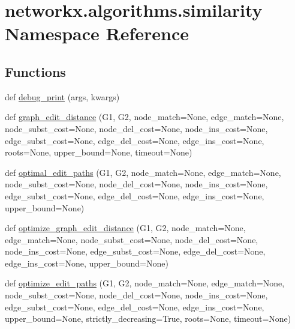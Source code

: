 \hypertarget{namespacenetworkx_1_1algorithms_1_1similarity}{}\section{networkx.\+algorithms.\+similarity Namespace Reference}
\label{namespacenetworkx_1_1algorithms_1_1similarity}
\subsection*{Functions}
\begin{DoxyCompactItemize}
\item 
def \hyperlink{namespacenetworkx_1_1algorithms_1_1similarity_a5d674d26dfed10d077b2bcba5902a5f8}{debug\+\_\+print} (args, kwargs)
\item 
def \hyperlink{namespacenetworkx_1_1algorithms_1_1similarity_a884d76faa68663c18288eb5f32eaea7b}{graph\+\_\+edit\+\_\+distance} (G1, G2, node\+\_\+match=None, edge\+\_\+match=None, node\+\_\+subst\+\_\+cost=None, node\+\_\+del\+\_\+cost=None, node\+\_\+ins\+\_\+cost=None, edge\+\_\+subst\+\_\+cost=None, edge\+\_\+del\+\_\+cost=None, edge\+\_\+ins\+\_\+cost=None, roots=None, upper\+\_\+bound=None, timeout=None)
\item 
def \hyperlink{namespacenetworkx_1_1algorithms_1_1similarity_a29f7692d60e03483f0160961805dc9fb}{optimal\+\_\+edit\+\_\+paths} (G1, G2, node\+\_\+match=None, edge\+\_\+match=None, node\+\_\+subst\+\_\+cost=None, node\+\_\+del\+\_\+cost=None, node\+\_\+ins\+\_\+cost=None, edge\+\_\+subst\+\_\+cost=None, edge\+\_\+del\+\_\+cost=None, edge\+\_\+ins\+\_\+cost=None, upper\+\_\+bound=None)
\item 
def \hyperlink{namespacenetworkx_1_1algorithms_1_1similarity_a094b2ec3e7fd9c7e6b285ff592c1384c}{optimize\+\_\+graph\+\_\+edit\+\_\+distance} (G1, G2, node\+\_\+match=None, edge\+\_\+match=None, node\+\_\+subst\+\_\+cost=None, node\+\_\+del\+\_\+cost=None, node\+\_\+ins\+\_\+cost=None, edge\+\_\+subst\+\_\+cost=None, edge\+\_\+del\+\_\+cost=None, edge\+\_\+ins\+\_\+cost=None, upper\+\_\+bound=None)
\item 
def \hyperlink{namespacenetworkx_1_1algorithms_1_1similarity_a07687d73f299d48abf6c9d20b43d1e4f}{optimize\+\_\+edit\+\_\+paths} (G1, G2, node\+\_\+match=None, edge\+\_\+match=None, node\+\_\+subst\+\_\+cost=None, node\+\_\+del\+\_\+cost=None, node\+\_\+ins\+\_\+cost=None, edge\+\_\+subst\+\_\+cost=None, edge\+\_\+del\+\_\+cost=None, edge\+\_\+ins\+\_\+cost=None, upper\+\_\+bound=None, strictly\+\_\+decreasing=True, roots=None, timeout=None)

\end{DoxyCompactItemize}
